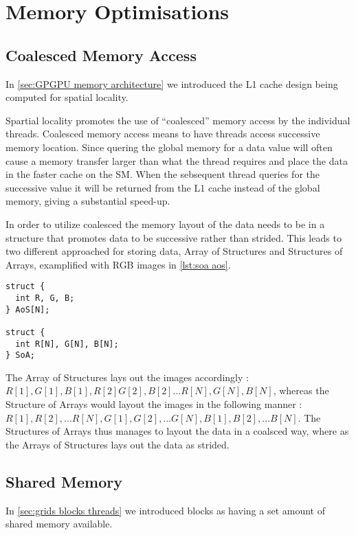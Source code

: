 \section{Memory Optimisations}
\label{sec:memory optimisations}
\subsection{Coalesced Memory Access}
\label{sec:coalesced}

In \cref{sec:GPGPU memory architecture} we introduced the L1 cache design being computed for spatial locality.

Spartial locality promotes the use of ``coalesced'' memory access by the individual threads.
Coalesced memory access means to have threads access successive memory location.
Since quering the global memory for a data value will often cause a memory transfer larger than what the thread requires and place the data in the faster cache on the SM.
When the sebsequent thread queries for the successive value it will be returned from the L1 cache instead of the global memory, giving a substantial speed-up.

In order to utilize coalesced the memory layout of the data needs to be in a structure that promotes data to be successive rather than strided.\cite{udacity}
This leads to two different approached for storing data, Array of Structures and Structures of Arrays, examplified with RGB images in \cref{lst:soa aos}.

\begin{lstlisting}[caption={Example of SoA and AoS with RGB images}, label={lst:soa aos}]
struct {
  int R, G, B;
} AoS[N];

struct {
  int R[N], G[N], B[N];
} SoA;
\end{lstlisting}

The Array of Structures lays out the images accordingly : $R[1], G[1], B[1], R[2] G[2], B[2] ... R[N], G[N], B[N]$, whereas the Structure of Arrays would layout the images in the following manner : $R[1], R[2], ... R[N], G[1], G[2], ... G[N], B[1], B[2], ... B[N]$.
The Structures of Arrays thus manages to layout the data in a coalsced way, where as the Arrays of Structures lays out the data as strided.

\subsection{Shared Memory}
In \cref{sec:grids blocks threads} we introduced blocks as having a set amount of shared memory available.

